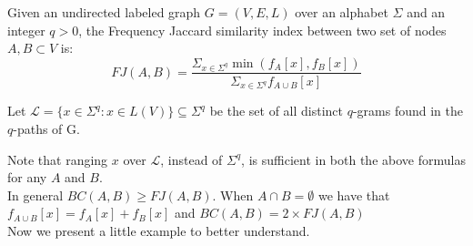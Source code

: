 \begin{definizione}
	Given an undirected labeled graph $G = (V,E,L)$ over an alphabet $\Sigma$ and an integer $q > 0$, the Frequency Jaccard similarity index between two set of nodes $A, B \subset V$ is:
	\begin{equation}	
	FJ(A,B) = \frac{ \Sigma_{x \in \Sigma^{q}} \min(f_{A}[x], f_{B}[x]) }{ \Sigma_{x \in \Sigma^{q}} f_{A \cup B}[x] }
	\end{equation}
\end{definizione}

Let $\mathcal{L} = \{ x \in \Sigma^{q} : x \in L(V) \} \subseteq \Sigma^{q}$ be the set of all distinct $q$-grams found in the $q$-paths of G. 

Note that ranging $x$ over $\mathcal{L}$, instead of $\Sigma^{q}$, is sufficient in both the above formulas for any $A$ and $B$.\\

In general $BC(A,B) \geq FJ(A,B)$. When $A \cap B = \emptyset$ we have that $f_{A \cup B}[x] = f_{A}[x] + f_{B}[x]$ and $BC(A,B) = 2 \times FJ(A,B)$\\




Now we present a little example to better understand.



